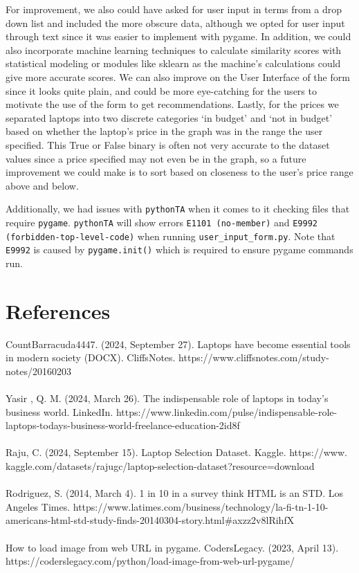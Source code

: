 \documentclass{article}
\begin{document}
\par For improvement, we also could have asked for user input in terms from a drop down list and included the more obscure data, although we opted for user input through text since it was easier to implement with pygame. In addition, we could also incorporate machine learning techniques to calculate similarity scores with statistical modeling or modules like sklearn as the machine’s calculations could give more accurate scores. We can also improve on the User Interface of the form since it looks quite plain, and could be more eye-catching for the users to motivate the use of the form to get recommendations. Lastly, for the prices we separated laptops into two discrete categories ‘in budget’ and ‘not in budget’ based on whether the laptop’s price in the graph was in the range the user specified. This True or False binary is often not very accurate to the dataset values since a price specified may not even be in the graph, so a future improvement we could make is to sort based on closeness to the user’s price range above and below.
\\
\par Additionally, we had issues with \texttt{pythonTA} when it comes to it checking files that require \texttt{pygame}. \texttt{pythonTA} will show errors \texttt{E1101 (no-member)} and \texttt{E9992 (forbidden-top-level-code)} when running \texttt{user\_input\_form.py}. Note that \texttt{E9992} is caused by \texttt{pygame.init()} which is required to ensure pygame commands run.

\section{References}
CountBarracuda4447. (2024, September 27). Laptops have become essential tools in modern society (DOCX). CliffsNotes. https://www.cliffsnotes.com/study-notes/20160203 
\\\\
Yasir , Q. M. (2024, March 26). The indispensable role of laptops in today’s business world. LinkedIn. https://www.linkedin.com/pulse/indispensable-role-laptops-todays-business-world-freelance-education-2id8f 
\\\\
Raju, C. (2024, September 15). Laptop Selection Dataset. Kaggle. https://www.\\kaggle.com/datasets/rajugc/laptop-selection-dataset?resource=download
\\\\
Rodriguez, S. (2014, March 4). 1 in 10 in a survey think HTML is an STD. Los Angeles Times. https://www.latimes.com/business/technology/la-fi-tn-1-10-americans-html-std-study-finds-20140304-story.html\#axzz2v8lRihfX 
\\\\
How to load image from web URL in pygame. CodersLegacy. (2023, April 13). https://coderslegacy.com/python/load-image-from-web-url-pygame/ 
\end{document}
